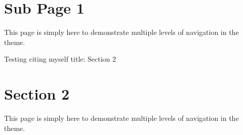 \hypertarget{sec:haha}{%
\section{Sub Page 1}\label{sec:haha}}

This page is simply here to demonstrate multiple levels of navigation in
the theme.

Testing citing myself \citep{Bluteau.etal2011_LaOM} title: Section 2

\section{Section 2}

This page is simply here to demonstrate multiple levels of navigation in
the theme.
